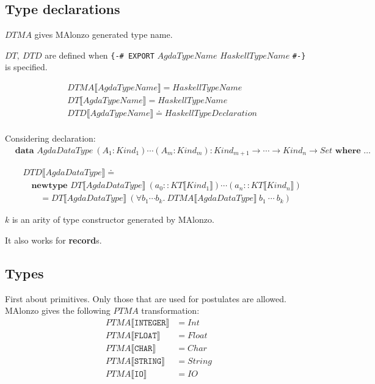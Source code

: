 \subsection{Type declarations}

\(DTMA\) gives MAlonzo generated type name.

\(DT,\ DTD\) are defined when \texttt{\{-\# EXPORT} \(AgdaTypeName\) \(HaskellTypeName\) \texttt{\#-\}} is specified.

\begin{align*}
   &DTMA\llbracket AgdaTypeName \rrbracket = HaskellTypeName\\
   &DT\llbracket AgdaTypeName \rrbracket = HaskellTypeName\\
   &DTD\llbracket AgdaTypeName \rrbracket \doteq HaskellTypeDeclaration\\
\end{align*}

Considering declaration:
\begin{align*}
   &\textbf{data } AgdaDataType\ (A_1 : Kind_1) \cdots (A_m : Kind_m) :
      Kind_{m+1} \rightarrow \cdots \rightarrow Kind_n \rightarrow Set \textbf{ where } \ldots
\end{align*}

\begin{align*}
   &DTD\llbracket AgdaDataType \rrbracket \doteq\\
   &\quad\textbf{newtype } DT\llbracket AgdaDataType \rrbracket\ (a_0 :: KT\llbracket Kind_1 \rrbracket)
      \cdots (a_n :: KT\llbracket Kind_n \rrbracket)\\
   &\quad\quad = DT\llbracket AgdaDataType \rrbracket\ (\forall b_1 \cdots b_k.\ DTMA\llbracket AgdaDataType \rrbracket\ b_1\ \cdots\ b_k)
\end{align*}

\(k\) is an arity of type constructor generated by MAlonzo.

It also works for \textbf{record}s.

\subsection{Types}

First about primitives. Only those that are used for postulates are allowed.
MAlonzo gives the following \(PTMA\) transformation:
\begin{align*}
   PTMA\llbracket \texttt{INTEGER} \rrbracket &= Int\\
   PTMA\llbracket \texttt{FLOAT} \rrbracket &= Float\\
   PTMA\llbracket \texttt{CHAR} \rrbracket &= Char\\
   PTMA\llbracket \texttt{STRING} \rrbracket &= String\\
   PTMA\llbracket \texttt{IO} \rrbracket &= IO
\end{align*}

